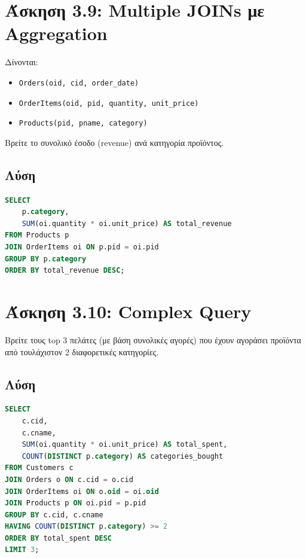 \section{Άσκηση 3.9: Multiple JOINs με Aggregation}

\begin{formulabox}[Εκφώνηση]
Δίνονται:
\begin{itemize}
    \item \texttt{Orders(oid, cid, order\_date)}
    \item \texttt{OrderItems(oid, pid, quantity, unit\_price)}
    \item \texttt{Products(pid, pname, category)}
\end{itemize}

Βρείτε το συνολικό έσοδο (revenue) ανά κατηγορία προϊόντος.
\end{formulabox}

\subsection*{Λύση}

\begin{lstlisting}[language=SQL]
SELECT
    p.category,
    SUM(oi.quantity * oi.unit_price) AS total_revenue
FROM Products p
JOIN OrderItems oi ON p.pid = oi.pid
GROUP BY p.category
ORDER BY total_revenue DESC;
\end{lstlisting}

\section{Άσκηση 3.10: Complex Query}

\begin{formulabox}[Εκφώνηση]
Βρείτε τους top 3 πελάτες (με βάση συνολικές αγορές) που έχουν αγοράσει προϊόντα
από τουλάχιστον 2 διαφορετικές κατηγορίες.
\end{formulabox}

\subsection*{Λύση}

\begin{lstlisting}[language=SQL]
SELECT
    c.cid,
    c.cname,
    SUM(oi.quantity * oi.unit_price) AS total_spent,
    COUNT(DISTINCT p.category) AS categories_bought
FROM Customers c
JOIN Orders o ON c.cid = o.cid
JOIN OrderItems oi ON o.oid = oi.oid
JOIN Products p ON oi.pid = p.pid
GROUP BY c.cid, c.cname
HAVING COUNT(DISTINCT p.category) >= 2
ORDER BY total_spent DESC
LIMIT 3;
\end{lstlisting}

